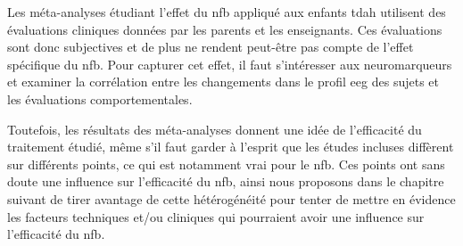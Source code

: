 Les méta-analyses étudiant l'effet du \gls{nfb} appliqué aux enfants \gls{tdah} utilisent des évaluations cliniques données par les parents et les enseignants.
Ces évaluations sont donc subjectives et de plus ne rendent peut-être pas compte de l'effet spécifique du \gls{nfb}. Pour capturer cet effet, il faut
s'intéresser aux neuromarqueurs et examiner la corrélation entre les changements dans le profil \gls{eeg} des sujets et les évaluations comportementales.

Toutefois, les résultats des méta-analyses donnent une idée de l'efficacité du traitement étudié, même s'il faut garder à l'esprit que les études incluses
diffèrent sur différents points, ce qui est notamment vrai pour le \gls{nfb}. Ces points ont sans doute une influence sur l'efficacité du \gls{nfb}, ainsi nous 
proposons dans le chapitre suivant de tirer avantage de cette hétérogénéité pour tenter de mettre en évidence les facteurs techniques et/ou cliniques qui
pourraient avoir une influence sur l'efficacité du \gls{nfb}.

  